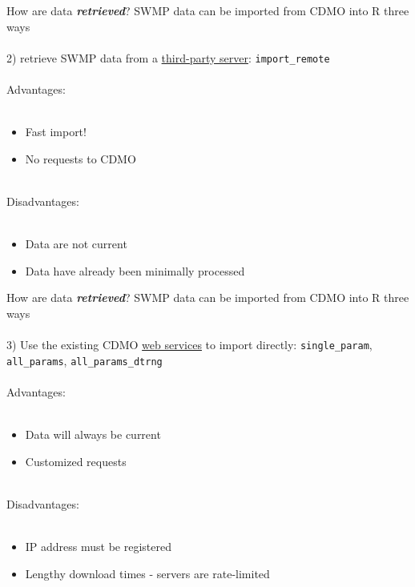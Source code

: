 \documentclass[serif]{beamer}\usepackage[]{graphicx}\usepackage[]{color}
\newcommand{\Bigtxt}[1]{\textbf{\textit{#1}}}
\begin{document}
\begin{frame}[t]{How are data \Bigtxt{retrieved}?}
SWMP data can be imported from CDMO into R three ways\\~\\
2) retrieve SWMP data from a \href{https://s3.amazonaws.com/swmpalldata/}{third-party server}: \texttt{import\_remote} \\~\\
Advantages:\\~\\
\begin{itemize}
\item Fast import!
\item No requests to CDMO\\~\\
\end{itemize}
Disadvantages:\\~\\
\begin{itemize}
\item Data are not current
\item Data have already been minimally processed
\end{itemize}
\end{frame}

\begin{frame}[t]{How are data \Bigtxt{retrieved}?}
SWMP data can be imported from CDMO into R three ways\\~\\
3) Use the existing CDMO \href{http://cdmo.baruch.sc.edu/webservices.cfm}{web services} to import directly:  \texttt{single\_param}, \texttt{all\_params}, \texttt{all\_params\_dtrng} \\~\\
Advantages: \\~\\
\begin{itemize}
\item Data will always be current
\item Customized requests\\~\\
\end{itemize}
Disadvantages:\\~\\
\begin{itemize}
\item IP address must be registered
\item Lengthy download times - servers are rate-limited
\end{itemize}
\end{frame}
\end{document}
